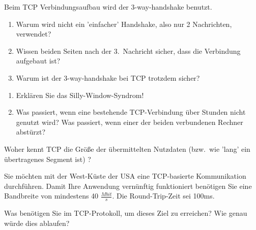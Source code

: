 
Beim TCP Verbindungsaufbau wird der 3-way-handshake benutzt.
\begin{enumerate}
    \item Warum wird nicht ein 'einfacher' Handshake, also nur 2 Nachrichten, verwendet?
    \item Wissen beiden Seiten nach der 3.\ Nachricht sicher, dass die Verbindung aufgebaut ist?
    \item Warum ist der 3-way-handshake bei TCP trotzdem sicher?
\end{enumerate}

\begin{enumerate}
    \item Erklären Sie das Silly-Window-Syndrom!
    \item Was passiert, wenn eine bestehende TCP-Verbindung über Stunden nicht genutzt wird?
    Was passiert, wenn einer der beiden verbundenen Rechner abstürzt?
\end{enumerate}

Woher kennt TCP die Größe der übermittelten Nutzdaten (bzw.\ wie 'lang' ein übertragenes Segment ist) ?

Sie möchten mit der West-Küste der USA eine TCP-basierte Kommunikation durchführen.
Damit Ihre Anwendung vernünftig funktioniert benötigen Sie eine Bandbreite von mindestens 40 $\frac{Mbit}{s}$.
Die Round-Trip-Zeit sei 100ms.

Was benötigen Sie im TCP-Protokoll, um dieses Ziel zu erreichen?
Wie genau würde dies ablaufen?